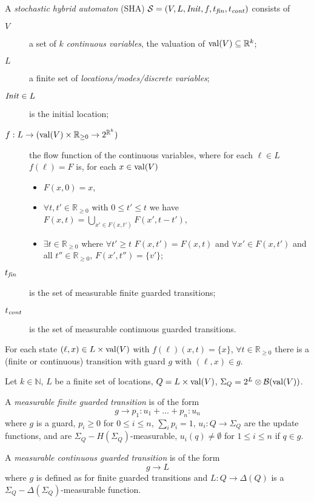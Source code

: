 \begin{defi}
A \emph{stochastic hybrid automaton} (SHA) $\mathcal{S}=(V, L, \mathit{Init}, f, t_{\mathit{fin}}, t_{\mathit{cont}})$ consists of

\begin{description}
    \item[$V$] a set of $k$ \emph{continuous variables}, the valuation of $\operatorname{val}(V)\subseteq\mathbb{R}^{k}$;
    \item[$L$] a finite set of \emph{locations/modes/discrete variables};
    \item[$\mathit{Init}\in L$] is the initial location;
    \item[$f: L \rightarrow (\operatorname{val}(V)\times \mathbb{R}_{\geq0} \rightarrow 2^{\mathbb{R}^k})$] the flow function of the continuous variables, where for each $\ell\in L$ $f(\ell)=F$ is, for each $x\in\operatorname{val}(V)$
    \begin{itemize}
        \item $F(x,0)=x$,
        \item $\forall t,t'\in \mathbb{R}_{\geq0}$ with $0\leq t'\leq t$ we have $F(x,t)=\bigcup_{x'\in F(x,t')} F(x',t-t')$,
        \item $\exists t\in \mathbb{R}_{\geq0}$ where $\forall t'\geq t$ $F(x,t')=F(x,t)$ and $\forall x'\in F(x,t')$ and all $t''\in \mathbb{R}_{\geq0}$, $F(x',t'')=\{v'\}$;
    \end{itemize}
    \item[$t_{\mathit{fin}}$] is the set of measurable finite guarded transitions;
    \item[$t_{\mathit{cont}}$] is the set of measurable continuous guarded transitions.
\end{description}
For each state $(\ell,x)\in L\times\operatorname{val}(V)$ with $f(\ell)(x,t)=\{x\}$, $\forall t\in\mathbb{R}_{\geq0}$ there is a (finite or continuous) transition with guard $g$ with $(\ell,x)\in g$.
\end{defi}

\begin{defi}
Let $k\in\mathbb{N}$, $L$ be a finite set of locations, $Q=L\times\operatorname{val}(V)$, $\Sigma_{Q}=2^{L}\otimes\mathcal{B}(\operatorname{val}(V))$.

A \emph{measurable finite guarded transition} is of the form
\[
    g \rightarrow p_{1}:u_{1}+\ldots+p_{n}:u_{n}
\]
where $g$ is a guard, $p_{i}\geq 0$ for $0\leq i\leq n$, $\sum_{i}p_{i}=1$, $u_{i}:Q\rightarrow \Sigma_{Q}$ are the update functions, and are $\Sigma_{Q}-H(\Sigma_{Q})$-measurable, $u_{i}(q)\neq\emptyset$ for $1\leq i\leq n$ if $q\in g$.

A \emph{measurable continuous guarded transition} is of the form
\[
    g \rightarrow L
\]
where $g$ is defined as for finite guarded transitions and $L: Q \rightarrow \Delta(Q)$ is a $\Sigma_{Q}-\Delta(\Sigma_{Q})$-measurable function.
\end{defi}

